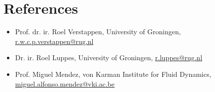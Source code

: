 \section*{References}
\begin{itemize}
    \item Prof. dr. ir. Roel Verstappen, University of Groningen, \href{mailto:r.w.c.p.verstappen@rug.nl}{r.w.c.p.verstappen@rug.nl}
    \item Dr. ir. Roel Luppes, University of Groningen, \href{mailto:r.luppes@rug.nl}{r.luppes@rug.nl}
    \item Prof. Miguel Mendez, von Karman Institute for Fluid Dynamics, 
    \href{mailto:miguel.alfonso.mendez@vki.ac.be}{miguel.alfonso.mendez@vki.ac.be}
\end{itemize}